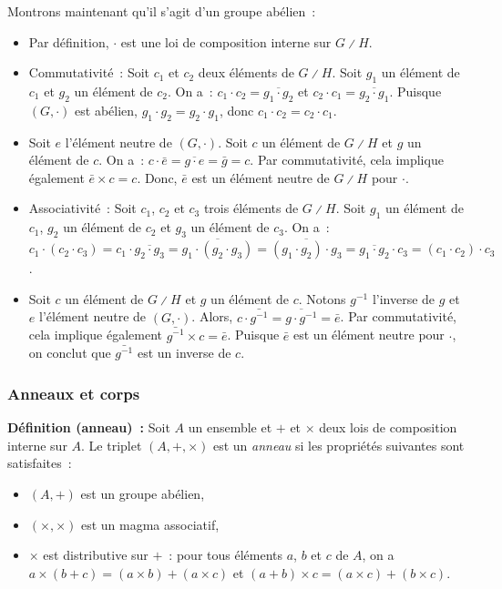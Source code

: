     Montrons maintenant qu'il s'agit d'un groupe abélien : 
    \begin{itemize}[nosep]
        \item Par définition, $\cdot$ est une loi de composition interne sur $G \divslash H$.
        \item Commutativité : Soit $c_1$ et $c_2$ deux éléments de $G \divslash H$.
            Soit $g_1$ un élément de $c_1$ et $g_2$ un élément de $c_2$. 
            On a : $c_1 \cdot c_2 = \overline{g_1 \cdot g_2}$ et $c_2 \cdot c_1 = \overline{g_2 \cdot g_1}$.
            Puisque $(G, \cdot)$ est abélien, $g_1 \cdot g_2 = g_2 \cdot g_1$, donc $c_1 \cdot c_2 = c_2 \cdot c_1$.
        \item Soit $e$ l'élément neutre de $(G, \cdot)$. 
            Soit $c$ un élément de $G \divslash H$ et $g$ un élément de $c$. 
            On a : $c \cdot \bar{e} = \overline{g \cdot e} = \bar{g} = c$.
            Par commutativité, cela implique également $\bar{e} \times c = c$.
            Donc, $\bar{e}$ est un élément neutre de $G \divslash H$ pour $\cdot$.
        \item Associativité : Soit $c_1$, $c_2$ et $c_3$ trois éléments de $G \divslash H$.
            Soit $g_1$ un élément de $c_1$, $g_2$ un élément de $c_2$ et $g_3$ un élément de $c_3$.
            On a : $c_1 \cdot (c_2 \cdot c_3) = c_1 \cdot \overline{g_2 \cdot g_3} = \overline{g_1 \cdot (g_2 \cdot g_3)} = \overline{(g_1 \cdot g_2) \cdot g_3} = \overline{g_1 \cdot g_2} \cdot c_3 = (c_1 \cdot c_2) \cdot c_3$.
        \item Soit $c$ un élément de $G \divslash H$ et $g$ un élément de $c$. 
            Notons $g^{-1}$ l'inverse de $g$ et $e$ l'élément neutre de $(G,\cdot)$. 
            Alors, $c \cdot \bar{g^{-1}} = \overline{g \cdot g^{-1}} = \bar{e}$.
            Par commutativité, cela implique également $\bar{g^{-1}} \times c = \bar{e}$.
            Puisque $\bar{e}$ est un élément neutre pour $\cdot$, on conclut que $\bar{g^{-1}}$ est un inverse de $c$.
    \end{itemize}

    \done

\subsubsection{Anneaux et corps}

\noindent\textbf{Définition (anneau) :} Soit $A$ un ensemble et $+$ et $\times$ deux lois de composition interne sur $A$. 
    Le triplet $(A, +, \times)$ est un \textit{anneau} si les propriétés suivantes sont satisfaites : 
    \begin{itemize}[nosep]
        \item $(A,+)$ est un groupe abélien,
        \item $(\times, \times)$ est un magma associatif,
        \item $\times$ est distributive sur $+$ : pour tous éléments $a$, $b$ et $c$ de $A$, on a $a \times (b + c) = (a \times b) + (a \times c)$ et $(a + b) \times c = (a \times c) + (b \times c)$.
    \end{itemize}

